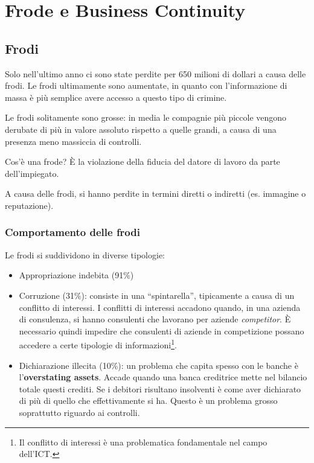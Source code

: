 \part{Frode e Business Continuity}

\chapter{Frodi}
\label{Frodi}

Solo nell'ultimo anno ci sono state perdite per 650 milioni di dollari
a causa delle frodi. Le frodi ultimamente sono aumentate,
in quanto con l'informazione di massa è più semplice avere accesso a
questo tipo di crimine.

Le frodi solitamente sono grosse: in media le compagnie più piccole vengono
derubate di più in valore assoluto rispetto a quelle grandi, a causa di una
presenza meno massiccia di controlli.

Cos'è una frode? È la violazione della fiducia del datore di lavoro da parte
dell'impiegato.

A causa delle frodi, si hanno perdite in termini diretti o
indiretti (es. immagine o reputazione).

\section{Comportamento delle frodi}

Le frodi si suddividono in diverse tipologie:

\begin{itemize}
  \item Appropriazione indebita (91\%)
  \item Corruzione (31\%): consiste in una ``spintarella'', tipicamente a causa di un conflitto di
  interessi. I conflitti di interessi accadono quando, in una azienda di
  consulenza, si hanno consulenti che lavorano per aziende \textit{competitor}.
  È necessario quindi impedire che consulenti di aziende in competizione possano
  accedere a   certe tipologie di informazioni\footnote{Il conflitto di interessi è una
  problematica fondamentale nel campo dell'ICT.}.
  \item Dichiarazione illecita (10\%): un problema che capita spesso con le banche è l'\textbf{overstating assets}.
  Accade quando una banca creditrice mette nel bilancio totale questi crediti.
  Se i debitori risultano insolventi è come aver dichiarato di più di quello
  che effettivamente si ha. Questo è un problema grosso soprattutto riguardo ai
  controlli.
\end{itemize}
